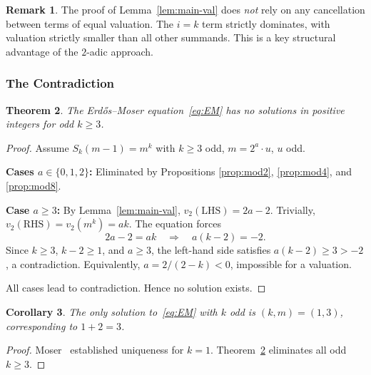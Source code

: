\documentclass[12pt,a4paper]{article}
\theoremstyle{plain}
\newtheorem{theorem}{Theorem}[section]
\newtheorem{corollary}[theorem]{Corollary}
\theoremstyle{definition}
\newtheorem{remark}[theorem]{Remark}
\begin{document}
\begin{remark}
  The proof of Lemma~\ref{lem:main-val} does \emph{not} rely on any
  cancellation between terms of equal valuation.  The $i=k$ term strictly
  dominates, with valuation strictly smaller than all other summands.
  This is a key structural advantage of the $2$-adic approach.
\end{remark}

\subsubsection{The Contradiction}
\label{sec:contradiction}

\begin{theorem}\label{thm:main}
  The Erd\H{o}s--Moser equation~\eqref{eq:EM} has no solutions in positive
  integers for odd $k \ge 3$.
\end{theorem}

\begin{proof}
  Assume $S_k(m-1) = m^k$ with $k \ge 3$ odd, $m = 2^a \cdot u$, $u$ odd.

  \textbf{Cases $a \in \{0,1,2\}$:} Eliminated by Propositions
  \ref{prop:mod2}, \ref{prop:mod4}, and \ref{prop:mod8}.

  \textbf{Case $a \ge 3$:} By Lemma~\ref{lem:main-val},
  $v_2(\text{LHS}) = 2a - 2$.  Trivially, $v_2(\text{RHS}) = v_2(m^k) = ak$.
  The equation forces
  \[
    2a - 2 = ak \quad\Longrightarrow\quad a(k-2) = -2.
  \]
  Since $k \ge 3$, $k-2 \ge 1$, and $a \ge 3$, the left-hand side satisfies
  $a(k-2) \ge 3 > -2$, a contradiction.  Equivalently,
  $a = 2/(2-k) < 0$, impossible for a valuation.

  All cases lead to contradiction.  Hence no solution exists.
\end{proof}

\begin{corollary}
  The only solution to~\eqref{eq:EM} with $k$ odd is $(k,m) = (1,3)$,
  corresponding to $1 + 2 = 3$.
\end{corollary}

\begin{proof}
  Moser~\cite{Moser} established uniqueness for $k=1$.
  Theorem~\ref{thm:main} eliminates all odd $k \ge 3$.
\end{proof}

\end{document}
